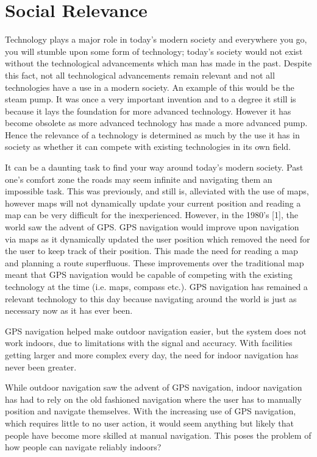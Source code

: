 \section{Social Relevance}

Technology plays a major role in today's modern society and everywhere you go, you will stumble upon some form of technology; today's society would not exist without the technological advancements which man has made in the past. Despite this fact, not all technological advancements remain relevant and not all technologies have a use in a modern society. An example of this would be the steam pump. It was once a very important invention and to a degree it still is because it lays the foundation for more advanced technology. However it has become obsolete as more advanced technology has made a more advanced pump. Hence the relevance of a technology is determined as much by the use it has in society as whether it can compete with existing technologies in its own field.

It can be a daunting task to find your way around today's modern society. Past one's comfort zone the roads may seem infinite and navigating them an impossible task. This was previously, and still is, alleviated with the use of maps, however maps will not dynamically update your current position and reading a map can be very difficult for the inexperienced. However, in the 1980's [1], the world saw the advent of GPS. GPS navigation would improve upon navigation via maps as it dynamically updated the user position which removed the need for the user to keep track of their position. This made the need for reading a map and planning a route superfluous. These improvements over the traditional map meant that GPS navigation would be capable of competing with the existing technology at the time (i.e. maps, compass etc.). GPS navigation has remained a relevant technology to this day because navigating around the world is just as necessary now as it has ever been.

GPS navigation helped make outdoor navigation easier, but the system does not work indoors, due to limitations with the signal and accuracy. With facilities getting larger and more complex every day, the need for indoor navigation has never been greater.

While outdoor navigation saw the advent of GPS navigation, indoor navigation has had to rely on the old fashioned navigation where the user has to manually position and navigate themselves. With the increasing use of GPS navigation, which requires little to no user action, it would seem anything but likely that people have become more skilled at manual navigation. This poses the problem of how people can navigate reliably indoors?

